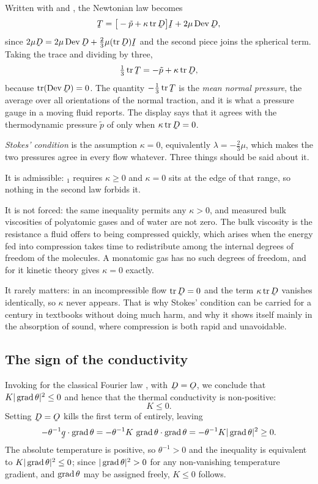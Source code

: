 \begin{remark}\label{rem:ch9stokes}
Written with  and , the Newtonian law 
becomes
\[
   \bT=\big[-\tilde p+\kappa\tr\bD\big]\I+2\mu\Dev\bD ,
\]
since $2\mu\bD=2\mu\Dev\bD+\tfrac23\mu(\tr\bD)\I$ and the second piece
joins the spherical term. Taking the trace and dividing by three,
\[
   \tfrac13\tr\bT=-\tilde p+\kappa\tr\bD ,
\]
because $\tr(\Dev\bD)=0$. The quantity $-\tfrac13\tr\bT$ is the
\emph{mean normal pressure}, the average over all orientations of the
normal traction, and it is what a pressure gauge in a moving fluid
reports. The display says that it agrees with the thermodynamic pressure
$\tilde p$ of  only when $\kappa\tr\bD=0$.

\emph{Stokes' condition} is the assumption $\kappa=0$, equivalently
$\lambda=-\tfrac23\mu$, which makes the two pressures agree in every
flow whatever. Three things should be said about it.

It is admissible: $_{1}$ requires $\kappa\geq0$ and $\kappa=0$
sits at the edge of that range, so nothing in the second law forbids it.

It is not forced: the same inequality permits any $\kappa>0$, and
measured bulk viscosities of polyatomic gases and of water are not zero.
The bulk viscosity is the resistance a fluid offers to being compressed
quickly, which arises when the energy fed into compression takes
time to redistribute among the internal degrees of freedom of the
molecules. A monatomic gas has no such degrees of freedom, and for it
kinetic theory gives $\kappa=0$ exactly.

It rarely matters: in an incompressible flow $\tr\bD=0$ and the term
$\kappa\tr\bD$ vanishes identically, so $\kappa$ never appears. That is
why Stokes' condition can be carried for a century in textbooks without
doing much harm, and why it shows itself mainly in the absorption of
sound, where compression is both rapid and unavoidable.
\end{remark}

\subsection*{The sign of the conductivity}

Invoking  for the classical Fourier law , with
$\bD=\Ob$, we conclude that $K|\operatorname{grad}\theta|^{2}\leq0$ and hence that the
thermal conductivity is non-positive:
\begin{equation}
   K\leq0 .
   \tag{9.80}\label{eq:9.80}
\end{equation}
Setting $\bD=\Ob$ kills the first term of  entirely, leaving
\[
   -\theta^{-1}\ip\bq{\grad\theta}
   =-\theta^{-1}K\,\ip{\grad\theta}{\grad\theta}
   =-\theta^{-1}K|\grad\theta|^{2}\geq0 .
\]
The absolute temperature is positive, so $\theta^{-1}>0$ and the
inequality is equivalent to $K|\operatorname{grad}\theta|^{2}\leq0$; since
$|\operatorname{grad}\theta|^{2}>0$ for any non-vanishing temperature gradient, and
$\operatorname{grad}\theta$ may be assigned freely, $K\leq0$ follows.

